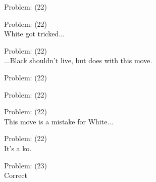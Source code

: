 \documentclass[11pt]{article}
\begin{document}
\begin{minipage}[t]{0.5\textwidth}
  {\centering
  
Problem: (22)\\
  }
\end{minipage}
\begin{minipage}[t]{0.5\textwidth}
  {\centering
  
Problem: (22)\\
White got tricked...\\
  }
\end{minipage}
\begin{minipage}[t]{0.5\textwidth}
  {\centering
  
Problem: (22)\\
...Black shouldn't live, but does with this move.\\
  }
\end{minipage}
\begin{minipage}[t]{0.5\textwidth}
  {\centering
  
Problem: (22)\\
  }
\end{minipage}
\begin{minipage}[t]{0.5\textwidth}
  {\centering
  
Problem: (22)\\
  }
\end{minipage}
\begin{minipage}[t]{0.5\textwidth}
  {\centering
  
Problem: (22)\\
This move is a mistake for White...\\
  }
\end{minipage}
\begin{minipage}[t]{0.5\textwidth}
  {\centering
  
Problem: (22)\\
It's a ko.\\
  }
\end{minipage}
\begin{minipage}[t]{0.5\textwidth}
  {\centering
  
Problem: (23)\\
Correct\\
  }
\end{minipage}
\end{document}
